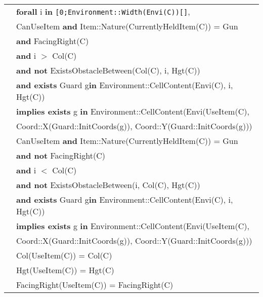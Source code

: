 \documentclass[7pt]{article}
\begin{document}
\begin{tabular}{rl}
& \textbf{forall} i \textbf{in}  \texttt{[0;Environment::Width(Envi(C))[]}, \\
& \quad CanUseItem \textbf{and} Item::Nature(CurrentlyHeldItem(C)) = Gun \\
& \quad\quad \textbf{and} FacingRight(C) \\
& \quad\quad \textbf{and} i $>$ Col(C) \\
& \quad\quad \textbf{and not}  ExistsObstacleBetween(Col(C), i, Hgt(C)) \\
& \quad\quad \textbf{and exists} Guard g\textbf{in} Environment::CellContent(Envi(C), i, Hgt(C)) \\
& \quad\quad \textbf{implies exists} g \textbf{in} Environment::CellContent(Envi(UseItem(C), \\
& \quad\quad \quad\quad Coord::X(Guard::InitCoords(g)), Coord::Y(Guard::InitCoords(g)))  \\
& \quad CanUseItem \textbf{and} Item::Nature(CurrentlyHeldItem(C)) = Gun \\
& \quad\quad \textbf{and not} FacingRight(C) \\
& \quad\quad \textbf{and} i $<$ Col(C) \\
& \quad\quad \textbf{and not}  ExistsObstacleBetween(i, Col(C), Hgt(C)) \\
& \quad\quad \textbf{and exists} Guard g\textbf{in} Environment::CellContent(Envi(C), i, Hgt(C)) \\
& \quad\quad \textbf{implies exists} g \textbf{in} Environment::CellContent(Envi(UseItem(C), \\
& \quad\quad \quad\quad Coord::X(Guard::InitCoords(g)), Coord::Y(Guard::InitCoords(g)))  \\

& Col(UseItem(C)) = Col(C) \\
& Hgt(UseItem(C)) = Hgt(C) \\
& FacingRight(UseItem(C)) = FacingRight(C) \\

\end{tabular}
\newpage
\end{document}
